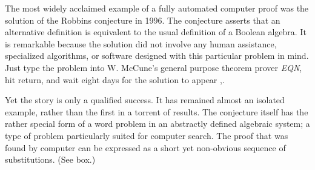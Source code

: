 \documentclass{llncs}
\begin{document}
The most widely acclaimed example of a fully automated computer proof
was the solution of the Robbins conjecture in 1996.  
The conjecture asserts that an alternative definition is equivalent
to the usual definition of a Boolean algebra.
It is remarkable
because the solution did not involve any human assistance,
specialized algorithms, or software
designed with this particular problem in mind.
Just type the problem into W. McCune's general purpose
theorem prover {\it EQN}, hit return, and wait
eight days for the solution to appear  \cite{Mc1},\cite{Mc2}.

Yet the story is only a qualified success.  It has
remained almost an isolated example, rather than the first in a torrent
of results.  The conjecture itself has the rather special form of a
word problem in an
abstractly defined algebraic system; a type of
problem particularly suited for computer search.
The proof that was found by
computer can be expressed as a short yet non-obvious sequence
of substitutions. (See box.)
\end{document}
